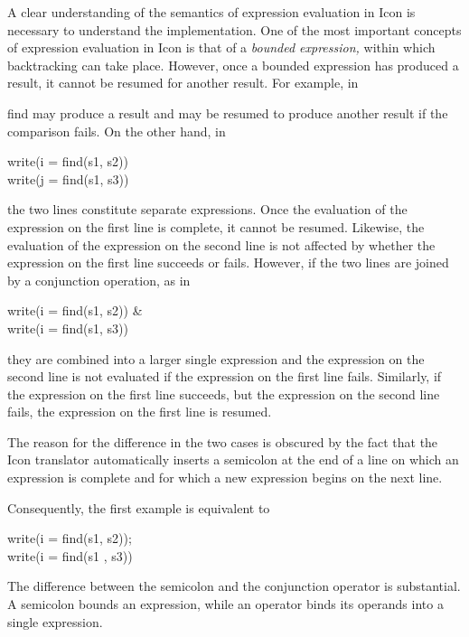 A clear understanding of the semantics of expression evaluation in
Icon is necessary to understand the implementation.  One of the most
important concepts of expression evaluation in Icon is that of a
\textit{bounded expression, }within which backtracking can take
place. However, once a bounded expression has produced a result, it
cannot be resumed for another result. For example, in


\noindent find may produce a result and may be resumed to produce
another result if the comparison fails. On the other hand, in

\begin{iconcode}
\>write(i = find(s1, s2))\\
\>write(j = find(s1, s3))
\end{iconcode}

\noindent the two lines constitute separate expressions. Once the
evaluation of the expression on the first line is complete, it cannot
be resumed. Likewise, the evaluation of the expression on the second
line is not affected by whether the expression on the first line
succeeds or fails. However, if the two lines are joined by a
conjunction operation, as in

\begin{iconcode}
\>write(i = find(s1, s2)) \&\\
\>write(i = find(s1, s3))
\end{iconcode}

\noindent they are combined into a larger single expression and the
expression on the second line is not evaluated if the expression on
the first line fails. Similarly, if the expression on the first line
succeeds, but the expression on the second line fails, the expression
on the first line is resumed.

The reason for the difference in the two cases is obscured by the fact
that the Icon translator automatically inserts a semicolon at the end
of a line on which an expression is complete and for which a new
expression begins on the next line.

Consequently, the first example is equivalent to

\begin{iconcode}
\>write(i = find(s1, s2));\\
\>write(i = find(s1 , s3))
\end{iconcode}

The difference between the semicolon and the conjunction operator is
substantial. A semicolon bounds an expression, while an operator binds
its operands into a single expression.

